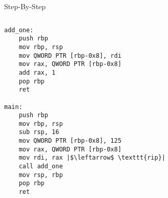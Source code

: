 \documentclass[hyphens,aspectratio=169]{beamer}
\begin{document}
\begin{frame}[fragile]{Step-By-Step}
    \begin{columns}
        \begin{column}{0.33\textwidth}
            \begin{verbatim}
add_one:
    push rbp
    mov rbp, rsp
    mov QWORD PTR [rbp-0x8], rdi
    mov rax, QWORD PTR [rbp-0x8]
    add rax, 1
    pop rbp
    ret

main:
    push rbp
    mov rbp, rsp
    sub rsp, 16
    mov QWORD PTR [rbp-0x8], 125
    mov rax, QWORD PTR [rbp-0x8]
    mov rdi, rax |$\leftarrow$ \texttt{rip}|
    call add_one
    mov rsp, rbp
    pop rbp
    ret
            \end{verbatim}
        \end{column}
        \begin{column}{0.33\textwidth}
\end{column}
\end{columns}
\end{frame}
\end{document}
